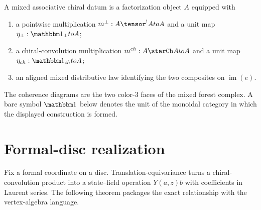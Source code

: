 \begin{definition}
A mixed associative chiral datum is a factorization object $A$ equipped with
\begin{enumerate}
\item a pointwise multiplication $m^\perp:A\tensor^!A\to A$ and a unit map $\eta_\perp:\mathbbm1_\perp\to A$;
\item a chiral-convolution multiplication $m^{\ch}:A\starCh A\to A$ and a unit map $\eta_{\ch}:\mathbbm1_{\ch}\to A$;
\item an aligned mixed distributive law identifying the two composites on $\operatorname{im}(e)$.
\end{enumerate}
The coherence diagrams are the two color-$3$ faces of the mixed forest complex.  A bare symbol $\mathbbm1$ below denotes the unit of the monoidal category in which the displayed construction is formed.
\end{definition}

\section{Formal-disc realization}
Fix a formal coordinate on a disc.  Translation-equivariance turns a chiral-convolution product into a state--field operation $Y(a,z)b$ with coefficients in Laurent series.  The following theorem packages the exact relationship with the vertex-algebra language.

